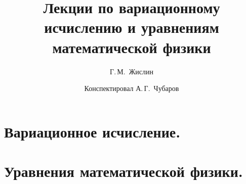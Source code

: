\documentclass[12pt,a4paper,openany,fleqn]{book}
\newcommand{\mc}[1]{\ensuremath{\mathcal{#1}}}
\theoremstyle{definition}
\begin{document}
	\author{Г.\,М.~Жислин}
	\title{Лекции по вариационному исчислению и уравнениям математической физики}
	\date{Конспектировал А.\,Г.~Чубаров}
	
	
	
	\maketitle
	\tableofcontents
	
	\renewcommand{\thepart}{\Asbuk{part}}
	\renewcommand{\thechapter}{\arabic{chapter}}
	\renewcommand{\thesection}{\arabic{section}}
	\renewcommand{\thesubsection}{\Roman{subsection}}
	\renewcommand{\thefootnote}{\roman{footnote}}
	\renewcommand{\phi}{\varphi}
	\renewcommand{\Re}{\ensuremath{\mc{R}e\,}}
	\renewcommand{\Im}{\ensuremath{\mc{I}m\,}}
	
	\part{Вариационное исчисление.}
	\label{part1}
	
	
	
	
	
	
	
	
	
	\part{Уравнения математической физики.}
	\label{part2}
	\setcounter{chapter}{10}
	
	
\end{document}
